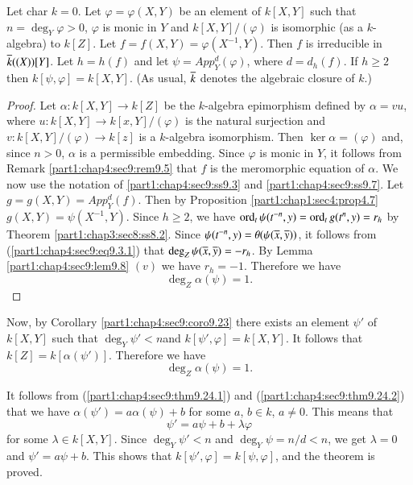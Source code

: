 \begin{thm}\label{part1:chap4:sec9:thm9.24}
Let char $k=0$. Let $\varphi= \varphi(X, Y)$ be an element of $k[X, Y]$ such that $n= \deg_Y \varphi > 0$, $\varphi$ is monic in $Y$ and $k[X, Y]/(\varphi)$ is isomorphic (as a $k$-algebra) to $k[Z]$. Let $f= f(X, Y)= \varphi (X^{-1}, Y)$. Then $f$ is irreducible in $\overline{k} ((X))[Y]$. Let $h= h(f)$ and let $\psi= App_Y^d (\varphi)$, where $d= d_h (f)$. If $h \geq 2$ then $k[\psi, \varphi] = k [X, Y]$. (As usual, $\overline{k}$ denotes the algebraic closure of $k$.)
\end{thm}

\begin{proof}
  Let $\alpha: k [X, Y] \to k [Z]$ be the $k$-algebra epimorphism defined by $\alpha = vu$, where $u: k [X, Y]\to k [x, Y]/ (\varphi)$ is the natural surjection and $v: k[X, Y]/(\varphi) \to k[z]$ is a $k$-algebra isomorphism. Then $\ker \alpha = (\varphi)$ and, since $n > 0$, $\alpha$ is a permissible embedding. Since $\varphi$ is monic in $Y$, it follows from Remark \ref{part1:chap4:sec9:rem9.5} that $f$ is the meromorphic equation of $\alpha$. We now use the notation of \ref{part1:chap4:sec9:ss9.3} and \ref{part1:chap4:sec9:ss9.7}. Let $g = g(X, Y)= App_Y^d (f)$. Then by Proposition \ref{part1:chap1:sec4:prop4.7} $g (X, Y)= \psi (X^{-1}, Y)$. Since $h \geq 2$, we have $\operatorname{ord}_t\psi (t^{-n}, y)= \operatorname{ord}_t g(t^n, y)=r_h$ by Theorem \ref{part1:chap3:sec8:ss8.2}. Since $\psi (t^{-n}, y)= \theta (\psi (\overline{x}, \overline{y}))$, it follows from (\ref{part1:chap4:sec9:eq9.3.1}) that $\deg_Z \psi (\overline{x}, \overline{y})=- r_h$. By Lemma \ref{part1:chap4:sec9:lem9.8} $(v)$ we have $r_h =-1$. Therefore we have
\begin{equation*}
  \deg_Z \alpha (\psi)=1. \tag{9.24.1} \label{part1:chap4:sec9:thm9.24.1}
\end{equation*}
\end{proof}

Now, by Corollary \ref{part1:chap4:sec9:coro9.23} there exists an element $\psi'$ of $k [X, Y]$ such that $\deg_Y \psi' < n$\pageoriginale and $k [\psi', \varphi]= k [X, Y]$. It follows that $k[Z]= k[\alpha(\psi')]$. Therefore we have 
\begin{equation*}
  \deg_Z \alpha (\psi)=1. \tag{9.24.2} \label{part1:chap4:sec9:thm9.24.2}
\end{equation*}

It follows from (\ref{part1:chap4:sec9:thm9.24.1}) and (\ref{part1:chap4:sec9:thm9.24.2}) that we have $\alpha (\psi')= a \alpha (\psi)+b$ for some $a$, $b \in k$, $a \neq 0$. This means that
$$
\psi' = a \psi + b + \lambda \varphi
$$
for some $\lambda \in k [X, Y]$. Since $\deg_Y \psi' < n$ and $\deg_Y \psi= n/d< n$, we get $\lambda =0$ and $\psi' = a\psi + b$. This shows that $k[\psi' , \varphi]= k[\psi, \varphi]$, and the theorem is proved.

